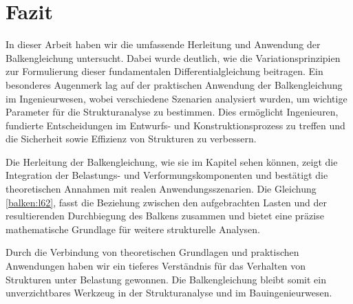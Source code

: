 %
%
%
%
\section{Fazit\label{balken:section:teil4}}

In dieser Arbeit haben wir die umfassende Herleitung und Anwendung der Balkengleichung untersucht. Dabei wurde deutlich, wie die Variationsprinzipien zur Formulierung dieser fundamentalen Differentialgleichung beitragen. Ein besonderes Augenmerk lag auf der praktischen Anwendung der Balkengleichung im Ingenieurwesen, wobei verschiedene Szenarien analysiert wurden, um wichtige Parameter für die Strukturanalyse zu bestimmen. Dies ermöglicht Ingenieuren, fundierte Entscheidungen im Entwurfs- und Konstruktionsprozess zu treffen und die Sicherheit sowie Effizienz von Strukturen zu verbessern.

Die Herleitung der Balkengleichung, wie sie im Kapitel
\cite{balken:Balkentheorie} sehen können, zeigt die Integration der
Belastungs- und Verformungskomponenten und bestätigt die theoretischen
Annahmen mit realen Anwendungsszenarien. Die Gleichung \eqref{balken:l62},
fasst die Beziehung zwischen den aufgebrachten Lasten und der
resultierenden Durchbiegung des Balkens zusammen und bietet eine
präzise mathematische Grundlage für weitere strukturelle Analysen.

Durch die Verbindung von theoretischen Grundlagen und praktischen Anwendungen haben wir ein tieferes Verständnis für das Verhalten von Strukturen unter Belastung gewonnen. Die Balkengleichung bleibt somit ein unverzichtbares Werkzeug in der Strukturanalyse und im Bauingenieurwesen.


